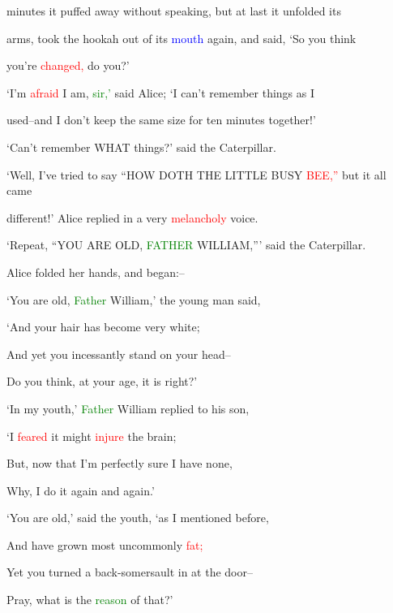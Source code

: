  minutes it puffed away without speaking, but at last it unfolded its

 arms, took the hookah out of its \textcolor{blue}{mouth} again, and said, ‘So you think

 you’re \textcolor{red}{changed,} do you?’



 ‘I’m \textcolor{red}{afraid} I am, \textcolor{green}{sir,’} said Alice; ‘I can’t remember things as I

 used--and I don’t keep the same size for ten minutes together!’



 ‘Can’t remember WHAT things?’ said the Caterpillar.



 ‘Well, I’ve tried to say “HOW DOTH THE LITTLE BUSY \textcolor{red}{BEE,”} but it all came

 different!’ Alice replied in a very \textcolor{red}{melancholy} voice.



 ‘Repeat, “YOU ARE OLD, \textcolor{green}{FATHER} WILLIAM,”’ said the Caterpillar.



 Alice folded her hands, and began:--



 ‘You are old, \textcolor{green}{Father} William,’ the \textcolor{BurntOrange}{young} man said,

 ‘And your hair has become very \textcolor{BurntOrange}{white;}

 And yet you incessantly stand on your head--

 Do you think, at your age, it is right?’



 ‘In my \textcolor{BurntOrange}{youth,’} \textcolor{green}{Father} William replied to his son,

 ‘I \textcolor{red}{feared} it might \textcolor{red}{injure} the brain;

 But, now that I’m perfectly sure I have none,

 Why, I do it again and again.’



 ‘You are old,’ said the \textcolor{BurntOrange}{youth,} ‘as I mentioned before,

 And have grown most uncommonly \textcolor{red}{fat;}

 Yet you turned a back-somersault in at the door--

 \textcolor{BurntOrange}{Pray,} what is the \textcolor{green}{reason} of that?’



